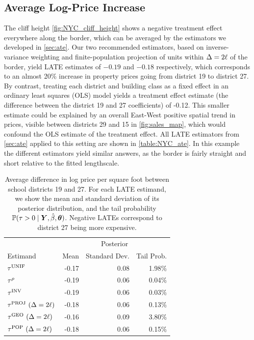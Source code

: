 \subsection{Average Log-Price Increase}
The cliff height \autoref{fig:NYC_cliff_height} shows a negative treatment effect everywhere along the border, which can be averaged by the estimators we developed in \autoref{sec:ate}.
Our two recommended estimators, based on inverse-variance weighting and finite-population projection of units within \(\Delta=2\ell\) of the border, yield LATE estimates of \(-0.19\) and \(-0.18\) respectively, which corresponds to an almost 20\% increase in property prices going from district 19 to district 27.
By contrast, treating each district and building class as a fixed effect in an ordinary least squares (OLS) model yields a treatment effect estimate (the difference between the district 19 and 27 coefficients) of -0.12. 
This smaller estimate could be explained by an overall East-West positive spatial trend in prices, visible between districts 29 and 15 in \autoref{fig:sales_map}, which would confound the OLS estimate of the treatment effect.
All LATE estimators from \autoref{sec:ate} applied to this setting are shown in \autoref{table:NYC_ate}.
In this example the different estimators yield similar answers, as the border is fairly straight and short relative to the fitted lengthscale.


\begin{table}
    \centering
    \begin{tabular}{lrrr}
        \hline
        & \multicolumn{3}{c}{Posterior} \\
        Estimand & Mean & Standard Dev. & Tail Prob. \\
        \hline
	      \(\tau^{\mathrm{UNIF}}\) & -0.17 & 0.08 & 1.98\% \\
	      \(\tau^{\rho}\) & -0.19 & 0.06 & 0.04\% \\
	      \(\tau^{\mathrm{INV}}\) & -0.19 & 0.06 & 0.03\% \\
	      \(\tau^{\mathrm{PROJ}}~(\Delta=2\ell)\) & -0.18 & 0.06 & 0.13\% \\
		  \(\tau^{\mathrm{GEO}}~(\Delta=2\ell)\) & -0.16 & 0.09 & 3.80\% \\
		  \(\tau^{\mathrm{POP}}~(\Delta=2\ell)\) & -0.18 & 0.06 & 0.15\% \\
        \hline
    \end{tabular}
    \caption{
    \label{table:NYC_ate}
Average difference in log price per square foot between school districts 19 and 27. For each LATE estimand, we show the mean and standard deviation of its posterior distribution, and the tail probability \(\operatorname{\mathbb{P}}(\tau > 0 \mid \bm{Y}, \hat{\beta}, \bm{\theta})\). 
Negative LATEs correspond to district 27 being more expensive.
}
\end{table}

